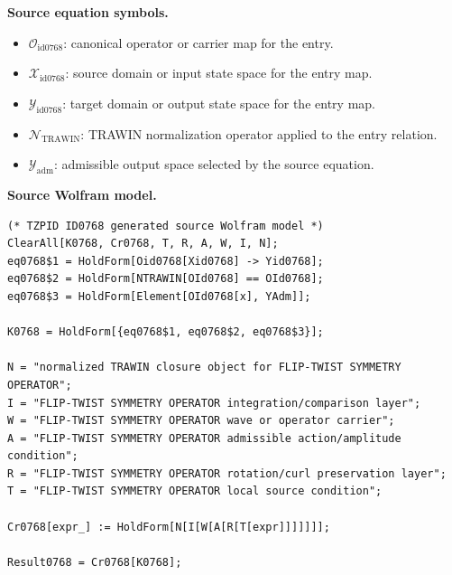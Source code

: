 \begin{minipage}[t]{0.49\linewidth}
\begingroup
\small
\raggedright
\textbf{Source equation symbols.}\par
\begin{itemize}[leftmargin=1.35em,itemsep=1pt,topsep=1pt,parsep=0pt]
    \item $\mathcal{O}_{\mathrm{id0768}}$: canonical operator or carrier map for the entry.
    \item $\mathcal{X}_{\mathrm{id0768}}$: source domain or input state space for the entry map.
    \item $\mathcal{Y}_{\mathrm{id0768}}$: target domain or output state space for the entry map.
    \item $\mathcal{N}_{\mathrm{TRAWIN}}$: TRAWIN normalization operator applied to the entry relation.
    \item $\mathcal{Y}_{\mathrm{adm}}$: admissible output space selected by the source equation.
\end{itemize}
\endgroup
\end{minipage}\hfill
\begin{minipage}[t]{0.47\linewidth}
\begingroup
\scriptsize
\raggedright
\textbf{Source Wolfram model.}\par
\begin{Verbatim}[fontsize=\tiny,breaklines=true,breakanywhere=true]
(* TZPID ID0768 generated source Wolfram model *)
ClearAll[K0768, Cr0768, T, R, A, W, I, N];
eq0768$1 = HoldForm[Oid0768[Xid0768] -> Yid0768];
eq0768$2 = HoldForm[NTRAWIN[OId0768] == OId0768];
eq0768$3 = HoldForm[Element[OId0768[x], YAdm]];

K0768 = HoldForm[{eq0768$1, eq0768$2, eq0768$3}];

N = "normalized TRAWIN closure object for FLIP-TWIST SYMMETRY OPERATOR";
I = "FLIP-TWIST SYMMETRY OPERATOR integration/comparison layer";
W = "FLIP-TWIST SYMMETRY OPERATOR wave or operator carrier";
A = "FLIP-TWIST SYMMETRY OPERATOR admissible action/amplitude condition";
R = "FLIP-TWIST SYMMETRY OPERATOR rotation/curl preservation layer";
T = "FLIP-TWIST SYMMETRY OPERATOR local source condition";

Cr0768[expr_] := HoldForm[N[I[W[A[R[T[expr]]]]]]];

Result0768 = Cr0768[K0768];
\end{Verbatim}
\endgroup
\end{minipage}

